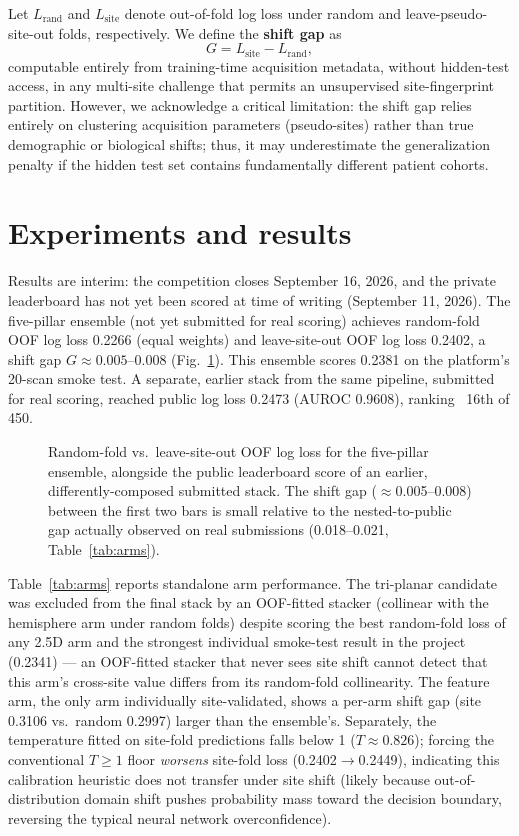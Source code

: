 \documentclass{article}
\newcommand{\shiftgap}{\ensuremath{G}}
\newcommand{\lrand}{\ensuremath{L_{\text{rand}}}}
\newcommand{\lsite}{\ensuremath{L_{\text{site}}}}
\begin{document}
Let \lrand{} and \lsite{} denote out-of-fold log loss under random and leave-pseudo-site-out folds, respectively. We define the \textbf{shift gap} as
\begin{equation}
\shiftgap = \lsite - \lrand,
\label{eq:shiftgap}
\end{equation}
computable entirely from training-time acquisition metadata, without hidden-test access, in any multi-site challenge that permits an unsupervised site-fingerprint partition. However, we acknowledge a critical limitation: the shift gap relies entirely on clustering acquisition parameters (pseudo-sites) rather than true demographic or biological shifts; thus, it may underestimate the generalization penalty if the hidden test set contains fundamentally different patient cohorts.

\section{Experiments and results}
\label{sec:results}

Results are interim: the competition closes September 16, 2026, and the private leaderboard has not yet been scored at time of writing (September 11, 2026). The five-pillar ensemble (not yet submitted for real scoring) achieves random-fold OOF log loss 0.2266 (equal weights) and leave-site-out OOF log loss 0.2402, a shift gap $\shiftgap \approx 0.005$--$0.008$ (Fig.~\ref{fig:shiftgap}). This ensemble scores 0.2381 on the platform's 20-scan smoke test. A separate, earlier stack from the same pipeline, submitted for real scoring, reached public log loss 0.2473 (AUROC 0.9608), ranking ~16th of 450.

\begin{figure}[t]
\centering

\caption{Random-fold vs.\ leave-site-out OOF log loss for the five-pillar ensemble, alongside the public leaderboard score of an earlier, differently-composed submitted stack. The shift gap ($\approx$0.005--0.008) between the first two bars is small relative to the nested-to-public gap actually observed on real submissions (0.018--0.021, Table~\ref{tab:arms}).}
\label{fig:shiftgap}
\end{figure}

Table~\ref{tab:arms} reports standalone arm performance. The tri-planar candidate was excluded from the final stack by an OOF-fitted stacker (collinear with the hemisphere arm under random folds) despite scoring the best random-fold loss of any 2.5D arm and the strongest individual smoke-test result in the project (0.2341) --- an OOF-fitted stacker that never sees site shift cannot detect that this arm's cross-site value differs from its random-fold collinearity. The feature arm, the only arm individually site-validated, shows a per-arm shift gap (site 0.3106 vs.\ random 0.2997) larger than the ensemble's. Separately, the temperature fitted on site-fold predictions falls below 1 ($T\approx0.826$); forcing the conventional $T \geq 1$ floor \emph{worsens} site-fold loss (0.2402$\to$0.2449),  indicating this calibration heuristic does not transfer under site shift (likely because out-of-distribution domain shift pushes probability mass toward the decision boundary, reversing the typical neural network overconfidence).
\end{document}
